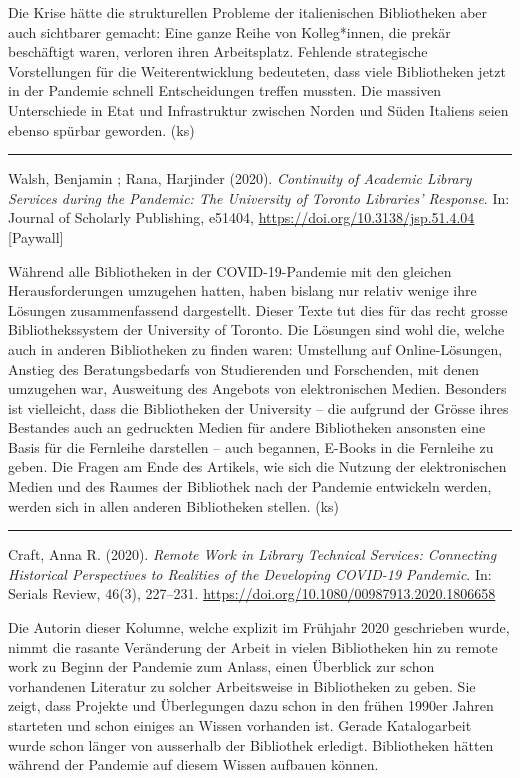 \documentclass[a4paper,
fontsize=11pt,
oneside,
numbers=noperiodatend,
parskip=half-,
bibliography=totoc,
final
]{scrartcl}
\begin{document}
Die Krise hätte die strukturellen Probleme der italienischen
Bibliotheken aber auch sichtbarer gemacht: Eine ganze Reihe von
Kolleg*innen, die prekär beschäftigt waren, verloren ihren Arbeitsplatz.
Fehlende strategische Vorstellungen für die Weiterentwicklung
bedeuteten, dass viele Bibliotheken jetzt in der Pandemie schnell
Entscheidungen treffen mussten. Die massiven Unterschiede in Etat und
Infrastruktur zwischen Norden und Süden Italiens seien ebenso spürbar
geworden. (ks)

\begin{center}\rule{0.5\linewidth}{0.5pt}\end{center}

Walsh, Benjamin ; Rana, Harjinder (2020). \emph{Continuity of Academic
Library Services during the Pandemic: The University of Toronto
Libraries' Response}. In: Journal of Scholarly Publishing, e51404,
\url{https://doi.org/10.3138/jsp.51.4.04} {[}Paywall{]}

Während alle Bibliotheken in der COVID-19-Pandemie mit den gleichen
Herausforderungen umzugehen hatten, haben bislang nur relativ wenige
ihre Lösungen zusammenfassend dargestellt. Dieser Texte tut dies für das
recht grosse Bibliothekssystem der University of Toronto. Die Lösungen
sind wohl die, welche auch in anderen Bibliotheken zu finden waren:
Umstellung auf Online-Lösungen, Anstieg des Beratungsbedarfs von
Studierenden und Forschenden, mit denen umzugehen war, Ausweitung des
Angebots von elektronischen Medien. Besonders ist vielleicht, dass die
Bibliotheken der University -- die aufgrund der Grösse ihres Bestandes
auch an gedruckten Medien für andere Bibliotheken ansonsten eine Basis
für die Fernleihe darstellen -- auch begannen, E-Books in die Fernleihe
zu geben. Die Fragen am Ende des Artikels, wie sich die Nutzung der
elektronischen Medien und des Raumes der Bibliothek nach der Pandemie
entwickeln werden, werden sich in allen anderen Bibliotheken stellen.
(ks)

\begin{center}\rule{0.5\linewidth}{0.5pt}\end{center}

Craft, Anna R. (2020). \emph{Remote Work in Library Technical Services:
Connecting Historical Perspectives to Realities of the Developing
COVID-19 Pandemic}. In: Serials Review, 46(3), 227--231.
\url{https://doi.org/10.1080/00987913.2020.1806658}

Die Autorin dieser Kolumne, welche explizit im Frühjahr 2020 geschrieben
wurde, nimmt die rasante Veränderung der Arbeit in vielen Bibliotheken
hin zu remote work zu Beginn der Pandemie zum Anlass, einen Überblick
zur schon vorhandenen Literatur zu solcher Arbeitsweise in Bibliotheken
zu geben. Sie zeigt, dass Projekte und Überlegungen dazu schon in den
frühen 1990er Jahren starteten und schon einiges an Wissen vorhanden
ist. Gerade Katalogarbeit wurde schon länger von ausserhalb der
Bibliothek erledigt. Bibliotheken hätten während der Pandemie auf diesem
Wissen aufbauen können.
\end{document}
